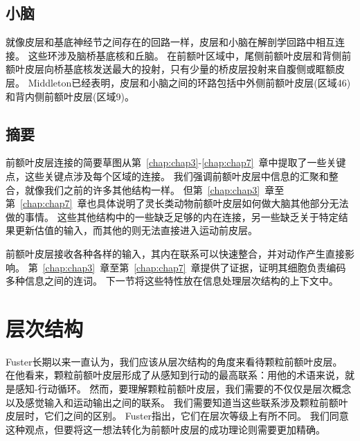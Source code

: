 \subsection{小脑}
\par

就像皮层和基底神经节之间存在的回路一样，皮层和小脑在解剖学回路中相互连接。
这些环涉及脑桥基底核和丘脑\cite{houk1995distributed}。
在前额叶区域中，尾侧前额叶皮层和背侧前额叶皮层向桥基底核发送最大的投射，只有少量的桥皮层投射来自腹侧或眶额皮层\cite{schmahmann1997anatomic,glickstein2008cerebellum}。
Middleton\cite{middleton1998cerebellar,middleton2001cerebellar}已经表明，皮层和小脑之间的环路包括中外侧前额叶皮层(区域46)和背内侧前额叶皮层(区域9)。



\subsection{摘要}
\par

前额叶皮层连接的简要草图从第~\ref{chap:chap3}-\ref{chap:chap7}~章中提取了一些关键点，这些关键点涉及每个区域的连接。
我们强调前额叶皮层中信息的汇聚和整合，就像我们之前的许多其他结构一样。
但第~\ref{chap:chap3}~章至第~\ref{chap:chap7}~章也具体说明了灵长类动物前额叶皮层如何做大脑其他部分无法做的事情。
这些其他结构中的一些缺乏足够的内在连接，另一些缺乏关于特定结果更新估值的输入，而其他的则无法直接进入运动前皮层。
\par


前额叶皮层接收各种各样的输入，其内在联系可以快速整合，并对动作产生直接影响。
第~\ref{chap:chap3}~章至第~\ref{chap:chap7}~章提供了证据，证明其细胞负责编码多种信息之间的连词。
下一节将这些特性放在信息处理层次结构的上下文中。



\section{层次结构}
\par

Fuster\cite{fuster2000executive}长期以来一直认为，我们应该从层次结构的角度来看待颗粒前额叶皮层。
在他看来，颗粒前额叶皮层形成了从感知到行动的最高联系：用他的术语来说，就是感知-行动循环。
然而，要理解颗粒前额叶皮层，我们需要的不仅仅是层次概念以及感觉输入和运动输出之间的联系。
我们需要知道当这些联系涉及颗粒前额叶皮层时，它们之间的区别。
Fuster指出，它们在层次等级上有所不同。
我们同意这种观点，但要将这一想法转化为前额叶皮层的成功理论则需要更加精确。
\par


